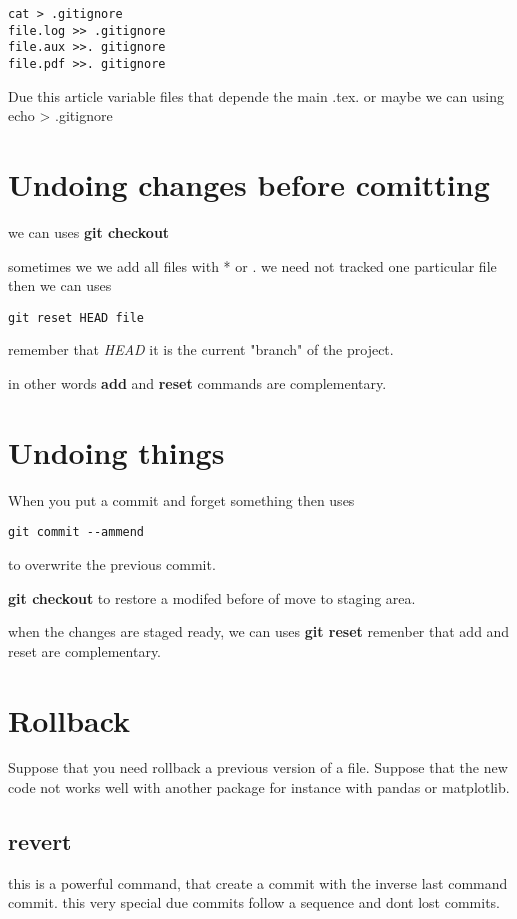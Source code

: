 \documentclass[10pt,a4paper]{article}
\begin{document}
\begin{verbatim}
cat > .gitignore
file.log >> .gitignore
file.aux >>. gitignore
file.pdf >>. gitignore
\end{verbatim}
 
Due this article variable files that depende the main .tex.
or maybe we can using echo > .gitignore


\section{Undoing changes before comitting}

we can uses \textbf{git checkout}


sometimes we we add all files with * or . 
we need not tracked one particular file then we can 
uses

\begin{verbatim}
git reset HEAD file
\end{verbatim}

remember that \textit{HEAD} it is the current "branch" of the project.

in other words \textbf{add} and \textbf{reset} commands are complementary.


\section{Undoing things}

When you put a commit and forget something then uses 
\begin{verbatim}
git commit --ammend
\end{verbatim}
to overwrite the previous commit.

\textbf{git checkout} to restore a modifed before of move to staging area.

when the changes are staged ready, we can uses \textbf{git reset} remenber that add and reset are complementary.

\section{Rollback}

Suppose that you need rollback a previous version of a file.
Suppose that the new code not works well with another package for instance with pandas or matplotlib.

\subsection{revert}
this is a powerful command,  that create a commit with the inverse last command commit. this very special due commits follow a sequence and dont lost commits.
\end{document}
